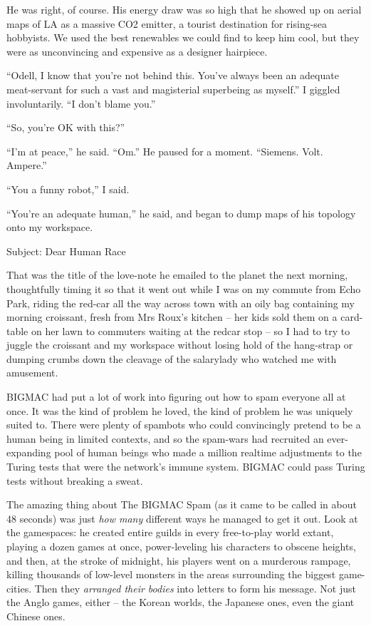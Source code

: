 He was right, of course. His energy draw was so high that he showed up 
on aerial maps of LA as a massive CO2 emitter, a tourist destination 
for rising-sea hobbyists. We used the best renewables we could find to 
keep him cool, but they were as unconvincing and expensive as a 
designer hairpiece.

“Odell, I know that you're not behind this. You've always been an 
adequate meat-servant for such a vast and magisterial superbeing as 
myself.” I giggled involuntarily. “I don't blame you.”

“So, you're OK with this?”

“I'm at peace,” he said. “Om.” He paused for a moment. 
“Siemens. Volt. Ampere.”

“You a funny robot,” I said.

“You're an adequate human,” he said, and began to dump maps of his 
topology onto my workspace.

\tb

Subject: Dear Human Race

That was the title of the love-note he emailed to the planet the next 
morning, thoughtfully timing it so that it went out while I was on my 
commute from Echo Park, riding the red-car all the way across town with 
an oily bag containing my morning croissant, fresh from Mrs Roux's 
kitchen -- her kids sold them on a card-table on her lawn to commuters 
waiting at the redcar stop -- so I had to try to juggle the croissant 
and my workspace without losing hold of the hang-strap or dumping 
crumbs down the cleavage of the salarylady who watched me with 
amusement.

BIGMAC had put a lot of work into figuring out how to spam everyone all 
at once. It was the kind of problem he loved, the kind of problem he 
was uniquely suited to. There were plenty of spambots who could 
convincingly pretend to be a human being in limited contexts, and so 
the spam-wars had recruited an ever-expanding pool of human beings who 
made a million realtime adjustments to the Turing tests that were the 
network's immune system. BIGMAC could pass Turing tests without 
breaking a sweat.

The amazing thing about The BIGMAC Spam (as it came to be called in 
about 48 seconds) was just \emph{how many} different ways he managed to 
get it out. Look at the gamespaces: he created entire guilds in every 
free-to-play world extant, playing a dozen games at once, 
power-leveling his characters to obscene heights, and then, at the 
stroke of midnight, his players went on a murderous rampage, killing 
thousands of low-level monsters in the areas surrounding the biggest 
game-cities. Then they \emph{arranged their bodies} into letters to 
form his message. Not just the Anglo games, either -- the Korean 
worlds, the Japanese ones, even the giant Chinese ones.

